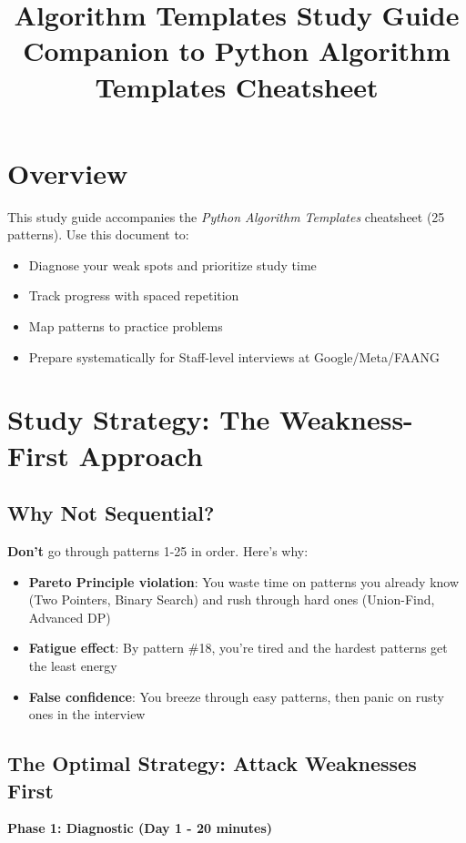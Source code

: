 \documentclass[10pt]{article}
\title{\textbf{Algorithm Templates Study Guide} \\ \large Companion to Python Algorithm Templates Cheatsheet}
\author{}
\date{}
\begin{document}
\maketitle

\section*{Overview}

This study guide accompanies the \textit{Python Algorithm Templates} cheatsheet (25 patterns). Use this document to:
\begin{itemize}
\item Diagnose your weak spots and prioritize study time
\item Track progress with spaced repetition
\item Map patterns to practice problems
\item Prepare systematically for Staff-level interviews at Google/Meta/FAANG
\end{itemize}

\section{Study Strategy: The Weakness-First Approach}

\subsection{Why Not Sequential?}

\textbf{Don't} go through patterns 1-25 in order. Here's why:
\begin{itemize}
\item \textbf{Pareto Principle violation}: You waste time on patterns you already know (Two Pointers, Binary Search) and rush through hard ones (Union-Find, Advanced DP)
\item \textbf{Fatigue effect}: By pattern \#18, you're tired and the hardest patterns get the least energy
\item \textbf{False confidence}: You breeze through easy patterns, then panic on rusty ones in the interview
\end{itemize}

\subsection{The Optimal Strategy: Attack Weaknesses First}

\textbf{Phase 1: Diagnostic (Day 1 - 20 minutes)}
\end{document}
